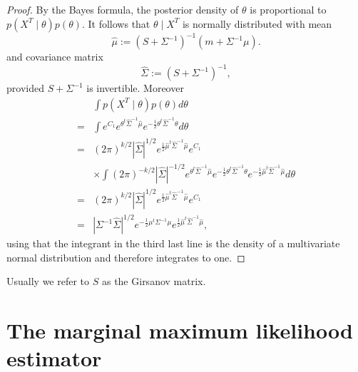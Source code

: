 \documentclass[12pt]{article}
\begin{document}
\begin{proof}
By the Bayes formula, the posterior density of \(\theta\) is proportional to \(p(X^T\mid\theta)p(\theta)\). It follows that  \(\theta\mid X^T\) is normally distributed with mean 
\[\hat\mu :=( S + \Sigma^{-1} )^{-1} (m + \Sigma^{-1}\mu).\]
 and covariance matrix \[\hat\Sigma:=(S+\Sigma^{-1})^{-1},\]
provided $S+\Sigma^{-1}$ is invertible.  
 Moreover 
 \begin{align*}
 &\int  p(X^T\mid\theta)p(\theta)d\theta \\
 = & \int  e^{C_1} e^{\theta^t\hat\Sigma^{-1}\hat\mu } e^{-\frac12\theta^t \hat\Sigma^{-1} \theta} d\theta\\
 = & (2\pi)^{k/2}| \hat\Sigma|^{1/2}e^{\frac12\hat\mu^t\hat\Sigma^{-1}\hat\mu}e^{C_1}\\
 &\times \int (2\pi)^{-k/2}|\hat\Sigma|^{-1/2}e^{\theta^t\hat\Sigma^{-1}\hat\mu } e^{-\frac12\theta^t \hat\Sigma^{-1} \theta} e^{-\frac12\hat\mu^t\hat\Sigma^{-1}\hat\mu}d\theta\\
 = & (2\pi)^{k/2}|\hat\Sigma|^{1/2}e^{\frac12\hat\mu^t\hat\Sigma^{-1}\hat\mu}e^{C_1}\\
 = & |\Sigma^{-1}\hat\Sigma|^{1/2}e^{-\frac12\mu^t\Sigma^{-1}\mu} e^{\frac12\hat\mu^t\hat\Sigma^{-1}\hat\mu},
 \end{align*}
 using that the integrant in the third last line is the density of a multivariate normal distribution and therefore integrates to one.
\end{proof}
Usually we refer to $S$ as the Girsanov matrix. 

\section{The marginal maximum likelihood estimator}
\end{document}
